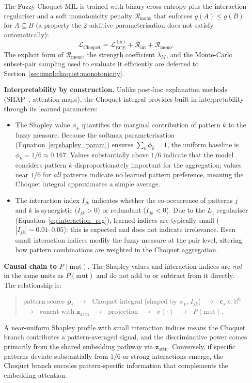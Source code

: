 The Fuzzy Choquet MIL is trained with binary cross-entropy plus the
interaction regulariser and a soft monotonicity penalty
$\mathcal{R}_{\text{mono}}$ that enforces
$g(A) \leq g(B)$ for $A \subseteq B$ (a property the 2-additive
parameterisation does not satisfy automatically):
\begin{equation}
\label{eq:choquet_loss}
\mathcal{L}_{\text{Choquet}} = \mathcal{L}_{\text{BCE}}^{(g)}
+ \mathcal{R}_{\text{int}}
+ \mathcal{R}_{\text{mono}}.
\end{equation}
The explicit form of $\mathcal{R}_{\text{mono}}$, the strength
coefficient $\lambda_M$, and the Monte-Carlo subset-pair sampling
used to evaluate it efficiently are deferred to
Section~\ref{sec:impl:choquet:monotonicity}.

\textbf{Interpretability by construction.}
Unlike post-hoc explanation methods (SHAP~\cite{lundberg2017shap}, attention maps), the Choquet integral provides built-in interpretability through its learned parameters:
\begin{itemize}
    \item The Shapley value $\phi_k$ quantifies the marginal contribution of pattern $k$ to the fuzzy measure.
    Because the softmax parameterisation (Equation~\ref{eq:shapley_param}) ensures $\sum_k \phi_k = 1$, the uniform baseline is $\phi_k = 1/6 \approx 0.167$.
    Values substantially above $1/6$ indicate that the model considers pattern $k$ disproportionately important for the aggregation; values near $1/6$ for \emph{all} patterns indicate no learned pattern preference, meaning the Choquet integral approximates a simple average.
    \item The interaction index $I_{jk}$ indicates whether the co-occurrence of patterns $j$ and $k$ is synergistic ($I_{jk} > 0$) or redundant ($I_{jk} < 0$).
    Due to the $L_1$ regulariser (Equation~\ref{eq:interaction_reg}), learned indices are typically small ($|I_{jk}| \sim 0.01\text{--}0.05$); this is expected and does not indicate irrelevance.
    Even small interaction indices modify the fuzzy measure at the pair level, altering how pattern combinations are weighted in the Choquet aggregation.
\end{itemize}

\textbf{Causal chain to $P(\text{mut})$.}
The Shapley values and interaction indices are \emph{not} in the same units as $P(\text{mut})$ and do not add to or subtract from it directly.
The relationship is:
\begin{quote}
pattern scores $\mathbf{p}_i$ $\;\to\;$ Choquet integral (shaped by $\phi_k$, $I_{jk}$) $\;\to\;$ $\mathbf{c}_s \in \mathbb{R}^6$ $\;\to\;$ concat with $\mathbf{z}_{\text{attn}}$ $\;\to\;$ projection $\;\to\;$ $\sigma(\cdot)$ $\;\to\;$ $P(\text{mut})$.
\end{quote}
A near-uniform Shapley profile with small interaction indices means the Choquet branch contributes a pattern-averaged signal, and the discriminative power comes primarily from the shared embedding pathway via $\mathbf{z}_{\text{attn}}$.
Conversely, if specific patterns deviate substantially from $1/6$ or strong interactions emerge, the Choquet branch encodes pattern-specific information that complements the embedding attention.

